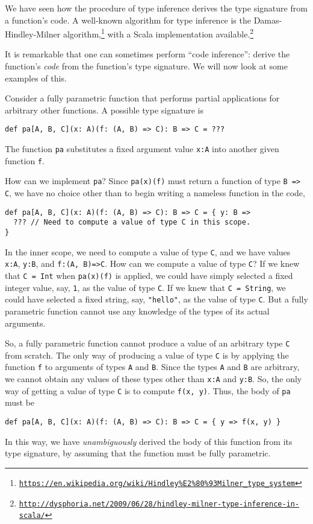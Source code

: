 We have seen how the procedure of type inference
derives the type signature from a function's code. A well-known algorithm
for type inference is the Damas-Hindley-Milner algorithm,\footnote{\texttt{\href{https://en.wikipedia.org/wiki/Hindley\%E2\%80\%93Milner_type_system}{https://en.wikipedia.org/wiki/Hindley\%E2\%80\%93Milner\_type\_system}}}
with a Scala implementation available.\footnote{\texttt{\href{http://dysphoria.net/2009/06/28/hindley-milner-type-inference-in-scala/}{http://dysphoria.net/2009/06/28/hindley-milner-type-inference-in-scala/}}}

It is remarkable that one can sometimes perform ``code
inference'': derive the function's \emph{code} from the function's
type signature. We will now look at some examples of this.

Consider a fully parametric function that performs partial applications
for arbitrary other functions. A possible type signature is
\begin{lstlisting}
def pa[A, B, C](x: A)(f: (A, B) => C): B => C = ???
\end{lstlisting}
The function \lstinline!pa! substitutes a fixed argument value \lstinline!x:A!
into another given function \lstinline!f!. 

How can we implement \lstinline!pa!? Since \lstinline!pa(x)(f)!
must return a function of type \lstinline!B => C!, we have no choice
other than to begin writing a nameless function in the code,
\begin{lstlisting}
def pa[A, B, C](x: A)(f: (A, B) => C): B => C = { y: B =>
  ??? // Need to compute a value of type C in this scope.
}
\end{lstlisting}
In the inner scope, we need to compute a value of type \lstinline!C!,
and we have values \lstinline!x:A!, \lstinline!y:B!, and \lstinline!f:(A, B)=>C!.
How can we compute a value of type \lstinline!C!? If we knew that
\lstinline!C = Int! when \lstinline!pa(x)(f)! is applied, we could
have simply selected a fixed integer value, say, \lstinline!1!, as
the value of type \lstinline!C!. If we knew that \lstinline!C = String!,
we could have selected a fixed string, say, \lstinline!"hello"!,
as the value of type \lstinline!C!. But a fully parametric function
cannot use any knowledge of the types of its actual arguments.

So, a fully parametric function cannot produce a value of an arbitrary
type \lstinline!C! from scratch. The only way of producing a value
of type \lstinline!C! is by applying the function \lstinline!f!
to arguments of types \lstinline!A! and \lstinline!B!. Since the
types \lstinline!A! and \lstinline!B! are arbitrary, we cannot obtain
any values of these types other than \lstinline!x:A! and \lstinline!y:B!.
So, the only way of getting a value of type \lstinline!C! is to compute
\lstinline!f(x, y)!. Thus, the body of \lstinline!pa! must be
\begin{lstlisting}
def pa[A, B, C](x: A)(f: (A, B) => C): B => C = { y => f(x, y) }
\end{lstlisting}
In this way, we have \emph{unambiguously} derived the body of this
function from its type signature, by assuming that the function must
be fully parametric.

